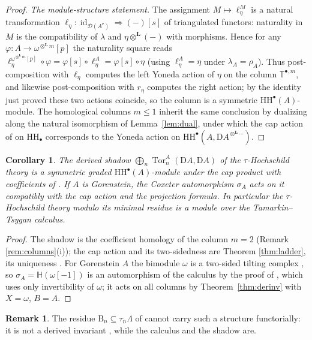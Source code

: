 \documentclass[11pt]{amsart}
\newtheorem{corollary}[theorem]{Corollary}
\theoremstyle{definition}
\newtheorem{remark}[theorem]{Remark}
\newcommand{\T}{\mathbb{T}}
\newcommand{\HH}{\mathrm{HH}}
\newcommand{\D}{\mathrm{D}}
\newcommand{\Tor}{\operatorname{Tor}}
\newcommand{\id}{\operatorname{id}}
\newcommand{\Ae}{A^{\mathrm{e}}}
\newcommand{\der}{\mathcal{D}}
\newcommand{\Lotimes}{\otimes^{\mathbf{L}}}
\begin{document}
\begin{proof}
\emph{The module-structure statement.} The assignment
$M\mapsto\ell^M_\eta$ is a natural transformation
$\ell_\eta\colon\id_{\der(\Ae)}\Rightarrow(-)[s]$ of triangulated functors:
naturality in $M$ is the compatibility of $\lambda$ and $\eta\Lotimes(-)$ with
morphisms. Hence for any $\varphi\colon A\to\omega^{\Lotimes m}[p]$ the
naturality square reads
$\ell^{\omega^{\Lotimes m}[p]}_\eta\circ\varphi=\varphi[s]\circ\ell^A_\eta
=\varphi[s]\circ\eta$ (using $\ell^A_\eta=\eta$ under $\lambda_A=\rho_A$).
Thus post-composition with $\ell_\eta$ computes the left Yoneda action of
$\eta$ on the column $\T^{\bullet,m}$, and likewise post-composition with
$r_\eta$ computes the right action; by the identity just proved these two
actions coincide, so the column is a symmetric $\HH^\bullet(A)$-module. The
homological columns $m\le1$ inherit the same conclusion by dualizing along the
natural isomorphism of Lemma~\ref{lem:dual}, under which the cap action of
\cite{ArmCap} on $\HH_\bullet$ corresponds to the Yoneda action on
$\HH^\bullet(A,\D A^{\Lotimes\cdots})$.
\end{proof}

\begin{corollary}\label{cor:shadow}
The derived shadow $\bigoplus_n\Tor^A_n(\D A,\D A)$ of the $\tau$-Hochschild
theory \cite{ArmTau,CLMS-tau} is a symmetric graded
$\HH^\bullet(A)$-module under the cap product with coefficients of
\cite{ArmCap}. If $A$ is Gorenstein, the Coxeter automorphism $\sigma_A$ acts
on it compatibly with the cap action and the projection formula. In
particular the $\tau$-Hochschild theory modulo its minimal residue is a
module over the Tamarkin--Tsygan calculus.
\end{corollary}

\begin{proof}
The shadow is the coefficient homology of the column $m=2$
(Remark \ref{rem:columns}(i)); the cap action and its two-sidedness are
Theorem \ref{thm:ladder}, its uniqueness \cite[Theorem 3.1]{ArmCap}. For
Gorenstein $A$ the bimodule $\omega$ is a two-sided tilting complex
\cite{HappelGor}, so $\sigma_A=\mathbb H(\omega[-1])$ is an automorphism of
the calculus by the proof of \cite[Theorem 4.2]{ArmCox}, which uses only
invertibility of $\omega$; it acts on all columns by
Theorem~\ref{thm:derinv} with $X=\omega$, $B=A$.
\end{proof}

\begin{remark}
The residue $\mathrm B_n\subseteq\tau_n\Lambda$ of \cite{ArmTau} cannot carry
such a structure functorially: it is not a derived invariant
\cite[Example 6.6]{ArmTau}, while the calculus and the shadow are.
\end{remark}
\end{document}
